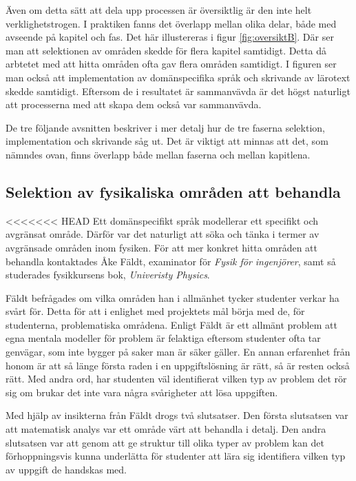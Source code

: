 \begin{binge}
Även om detta sätt att dela upp processen är översiktlig är den inte helt
verklighetstrogen. I praktiken fanns det överlapp mellan olika delar, både med
avseende på kapitel och fas. Det här illustereras i figur \ref{fig:oversiktB}.
Där ser man att selektionen av områden skedde för flera kapitel samtidigt.
Detta då arbtetet med att hitta områden ofta gav flera områden samtidigt. I
figuren ser man också att implementation av domänspecifika språk och skrivande
av lärotext skedde samtidigt. Eftersom de i resultatet är sammanvävda är det
högst naturligt att processerna med att skapa dem också var sammanvävda.

De tre följande avsnitten beskriver i mer detalj hur de tre faserna selektion,
implementation och skrivande såg ut. Det är viktigt att minnas att det, som
nämndes ovan, finns överlapp både mellan faserna och mellan kapitlena.

\subsection{Selektion av fysikaliska områden att behandla}
\label{sec:selektion}

<<<<<<< HEAD
Ett domänspecifikt språk modellerar ett specifikt och avgränsat område. Därför
var det naturligt att söka och tänka i termer av avgränsade områden inom
fysiken. För att mer konkret hitta områden att behandla kontaktades Åke Fäldt,
examinator för \textit{Fysik för ingenjörer}, samt så studerades fysikkursens
bok, \textit{Univeristy Physics}.

Fäldt befrågades om vilka områden han i allmänhet tycker studenter verkar ha
svårt för. Detta för att i enlighet med projektets mål börja med de, för
studenterna, problematiska områdena. Enligt Fäldt är ett allmänt problem att
egna mentala modeller för problem är felaktiga eftersom studenter ofta tar
genvägar, som inte bygger på saker man är säker gäller. En annan erfarenhet
från honom är att så länge första raden i en uppgiftslösning är rätt, så är
resten också rätt. Med andra ord, har studenten väl identifierat vilken typ av
problem det rör sig om brukar det inte vara några svårigheter att lösa
uppgiften.

Med hjälp av insikterna från Fäldt drogs två slutsatser. Den första slutsatsen
var att matematisk analys var ett område värt att behandla i detalj. Den andra
slutsatsen var att genom att ge struktur till olika typer av problem kan det
förhoppningsvis kunna underlätta för studenter att lära sig identifiera vilken
typ av uppgift de handskas med.


\end{binge}
